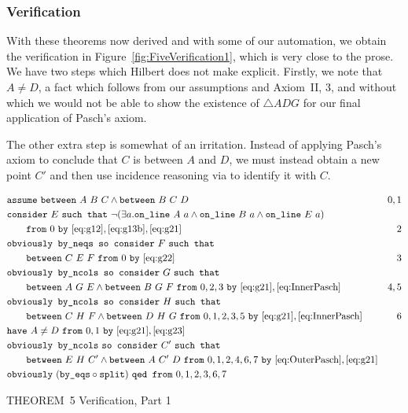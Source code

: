\subsubsection{Verification}
With these theorems now derived and with some of our automation, we obtain the verification in Figure~\ref{fig:FiveVerification1}, which is very close to the prose. We have two steps which Hilbert does not make explicit. Firstly, we note that $A\neq D$, a fact which follows from our assumptions and Axiom~II, 3, and without which we would not be able to show the existence of $\triangle ADG$ for our final application of Pasch's axiom.

The other extra step is somewhat of an irritation. Instead of applying Pasch's axiom to conclude that $C$ is between $A$ and $D$, we must instead obtain a new point $C'$ and then use incidence reasoning via  to identify it with $C$. 

\begin{boxedfigure}
\scriptsize
  \begin{align*}
    &\code{assume}\ \between{A}{B}{C} \wedge \between{B}{C}{D} & 0,1\\
    &\code{consider}\ E\ \code{such that}\ \Triangle{a}{A}{B}{E}\\
    &\qquad\code{from}\ 0\ \code{by}\ \eqref{eq:g12},\eqref{eq:g13b},\eqref{eq:g21} & 2\\
    &\code{obviously by\_neqs so consider}\ F\ \code{such that}\\
    &\qquad\between{C}{E}{F}\ \code{from}\ 0\ \code{by}\ \eqref{eq:g22} & 3\\
    &\code{obviously by\_ncols so consider}\ G\ \code{such that}\\ 
    &\qquad\between{A}{G}{E} \wedge \between{B}{G}{F}\ \code{from}\ 0,2,3\ \code{by}\
    \eqref{eq:g21},\eqref{eq:InnerPasch}& 4,5\\    
    &\code{obviously by\_ncols so consider}\ H\ \code{such that}\\ 
    &\qquad\between{C}{H}{F} \wedge \between{D}{H}{G}\ \code{from}\ 0,1,2,3,5\ \code{by}\ \eqref{eq:g21},\eqref{eq:InnerPasch}& 6\\
    &\code{have}\ A\neq D\ \code{from}\ 0,1\ \code{by}\ \eqref{eq:g21},\eqref{eq:g23}\\
    &\code{obviously by\_ncols}\ \code{so consider}\ C'\ \code{such that}\\
    &\qquad\between{E}{H}{C'}\wedge\between{A}{C'}{D}\ \code{from}\ 0,1,2,4,6,7\ \code{by}\ \eqref{eq:OuterPasch},\eqref{eq:g21}\\
    &\code{obviously}\ (\code{by\_eqs}\circ\code{split})\ \code{qed from}\ 0,1,2,3,6,7
  \end{align*}
  \caption{THEOREM~5 Verification, Part 1}
  \label{fig:FiveVerification1}
\end{boxedfigure}

